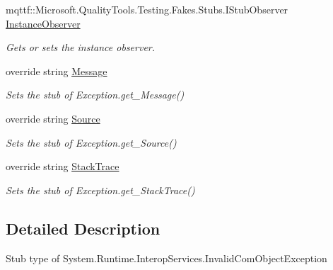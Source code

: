 \begin{DoxyCompactItemize}
mqttf\-::\-Microsoft.\-Quality\-Tools.\-Testing.\-Fakes.\-Stubs.\-I\-Stub\-Observer \hyperlink{class_system_1_1_runtime_1_1_interop_services_1_1_fakes_1_1_stub_invalid_com_object_exception_ab7aa35cc712bf80fef903cb5e8058ce7}{Instance\-Observer}
\begin{DoxyCompactList}\small\item\em Gets or sets the instance observer.\end{DoxyCompactList}\item 
override string \hyperlink{class_system_1_1_runtime_1_1_interop_services_1_1_fakes_1_1_stub_invalid_com_object_exception_a4fe40e94638d9f51a05b65e2eee075a1}{Message}
\begin{DoxyCompactList}\small\item\em Sets the stub of Exception.\-get\-\_\-\-Message()\end{DoxyCompactList}\item 
override string \hyperlink{class_system_1_1_runtime_1_1_interop_services_1_1_fakes_1_1_stub_invalid_com_object_exception_aac15d1e986d32938f0399e8fb9926ac4}{Source}
\begin{DoxyCompactList}\small\item\em Sets the stub of Exception.\-get\-\_\-\-Source()\end{DoxyCompactList}\item 
override string \hyperlink{class_system_1_1_runtime_1_1_interop_services_1_1_fakes_1_1_stub_invalid_com_object_exception_a66e5475d5c001bba2f76a91496d6fd68}{Stack\-Trace}
\begin{DoxyCompactList}\small\item\em Sets the stub of Exception.\-get\-\_\-\-Stack\-Trace()\end{DoxyCompactList}\end{DoxyCompactItemize}


\subsection{Detailed Description}
Stub type of System.\-Runtime.\-Interop\-Services.\-Invalid\-Com\-Object\-Exception



